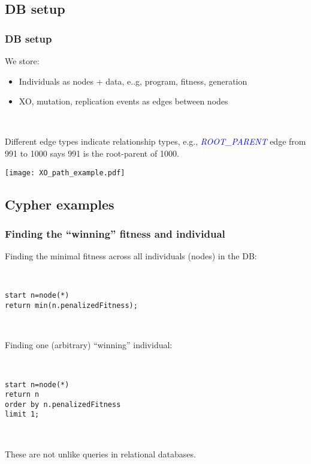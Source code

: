 \documentclass{beamer}
\begin{document}
\subsection{DB setup}

\begin{frame}
\frametitle{DB setup}

We store:
\begin{itemize}
	\item Individuals as nodes + data, e..g, program, fitness, generation
	\item XO, mutation, replication events as edges between nodes
\end{itemize}

~

Different edge types indicate relationship types, e.g., \textcolor{blue}{\emph{ROOT\_PARENT}} edge from 991 to 1000 says 991 is the root-parent of 1000.

\begin{center}
\texttt{[image: XO\_path\_example.pdf]}
\end{center}

\end{frame}

\subsection{Cypher examples}

\begin{frame}
\frametitle{Finding the ``winning'' fitness and individual}

Finding the minimal fitness across all individuals (nodes) in the DB:

~ 

\texttt{start n=node(*) \\
return min(n.penalizedFitness);
}

~

Finding one (arbitrary) ``winning'' individual:

~

\texttt{start n=node(*) \\
return n \\
order by n.penalizedFitness \\
limit 1;
}

~

These are not unlike queries in relational databases.

\end{frame}
\end{document}
